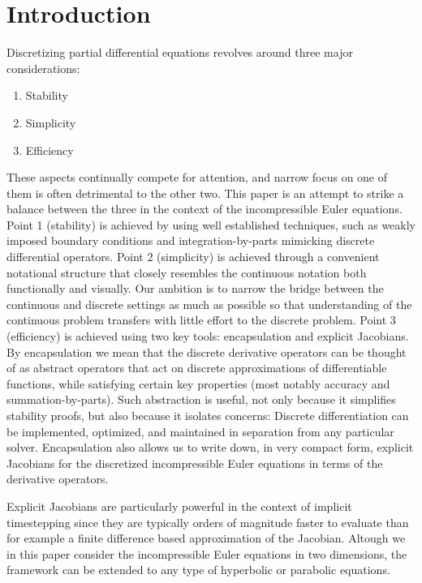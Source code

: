 \section{Introduction}%
\label{sec:introduction}

Discretizing partial differential equations revolves around three major considerations:
\begin{enumerate}
  \item Stability
  \item Simplicity
  \item Efficiency
\end{enumerate}
These aspects continually compete for attention, and narrow focus on one of them is often detrimental to the other two. This paper is an attempt to strike a balance between the three in the context of the incompressible Euler equations. Point 1 (stability) is achieved by using well established techniques, such as weakly imposed boundary conditions and integration-by-parts mimicking discrete differential operators. Point 2 (simplicity) is achieved through a convenient notational structure that closely resembles the continuous notation both functionally and visually. Our ambition is to narrow the bridge between the continuous and discrete settings as much as possible so that understanding of the continuous problem transfers with little effort to the discrete problem. Point 3 (efficiency) is achieved using two key tools: encapsulation and explicit Jacobians. By encapsulation we mean that the discrete derivative operators can be thought of as abstract operators that act on discrete approximations of differentiable functions, while satisfying certain key properties (most notably accuracy and summation-by-parts). Such abstraction is useful, not only because it simplifies stability proofs, but also because it isolates concerns: Discrete differentiation can be implemented, optimized, and maintained in separation from any particular solver. Encapsulation also allows us to write down, in very compact form, explicit Jacobians for the discretized incompressible Euler equations in terms of the derivative operators. 

Explicit Jacobians are particularly powerful in the context of implicit timestepping since they are typically orders of magnitude faster to evaluate than for example a finite difference based approximation of the Jacobian. Altough we in this paper consider the incompressible Euler equations in two dimensions, the framework can be extended to any type of hyperbolic or parabolic equations.

